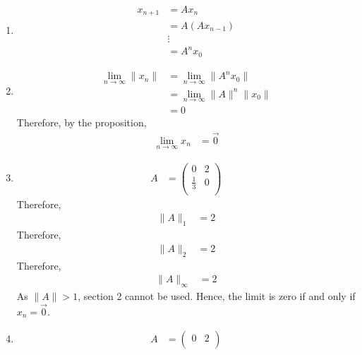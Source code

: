 \documentclass[fleqn, a4paper, 11pt, oneside]{amsart}
\theoremstyle{definition}
\theoremstyle{theorem}
\begin{document}
\begin{solution}
	\begin{enumerate}[leftmargin=*]
		\item
			\begin{align*}
				x_{n + 1} & = A x_n           \\
                                          & = A (A x_{n - 1}) \\
                                          & \vdots            \\
                                          & = A^n x_0
			\end{align*}
		\item
			\begin{align*}
				\lim\limits_{n \to \infty} \|x_n\| & = \lim\limits_{n \to \infty} \left\| A^n x_0 \right\| \\
                                                                   & = \lim\limits_{n \to \infty} \|A\|^n \|x_0\|          \\
                                                                   & = 0
			\end{align*}
			Therefore, by the proposition,
			\begin{align*}
				\lim\limits_{n \to \infty} x_n & = \overrightarrow{0}
			\end{align*}
		\item
			\begin{align*}
				A &=
					\begin{pmatrix}
						0           & 2 \\
						\frac{1}{3} & 0 \\
					\end{pmatrix}
			\end{align*}
			Therefore,
			\begin{align*}
				\|A\|_1 & = 2
			\end{align*}
			Therefore,
			\begin{align*}
				\|A\|_2 & = 2
			\end{align*}
			Therefore,
			\begin{align*}
				\|A\|_{\infty} & = 2
			\end{align*}
			As $\|A\| > 1$, section 2 cannot be used.
			Hence, the limit is zero if and only if $x_n = \overrightarrow{0}$.
		\item
			\begin{align*}
				A &=
					\begin{pmatrix}
						0           & 2 \\

\end{pmatrix}
\end{align*}
\end{enumerate}
\end{solution}
\end{document}
